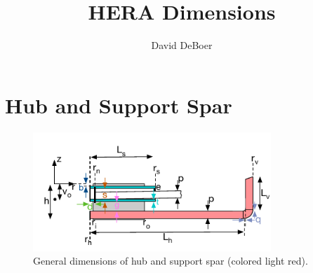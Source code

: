 \documentclass{article}
\begin{document}
\author{David DeBoer}
\title{HERA Dimensions} 
\maketitle

\section{Hub and Support Spar}
\begin{figure}[H]
\includegraphics[width=0.8\textwidth]{hubdims.pdf}
\centering
\vspace{-.15in}
\caption{General dimensions of hub and support spar (colored light red).}
\label{fig:hubdims}
\end{figure}
\end{document}
